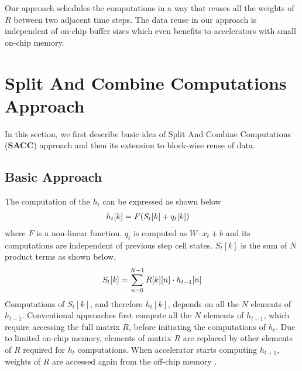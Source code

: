 Our approach schedules the computations in a way that reuses all the weights of $R$ between two adjacent time steps. The data reuse in our approach is independent of on-chip buffer sizes which even benefits to accelerators with small on-chip memory. 

\section{Split And Combine Computations Approach}
In this section, we first describe basic idea of Split And Combine Computations (\textbf{SACC}) approach and then its extension to block-wise reuse of data.
\subsection{Basic Approach}\label{sec:elementWiseApproach}
The computation of the $h_t$ can be expressed as shown below
\begin{align}\label{eq:h_{t}}
	h_{t}[k] &= F( S_{t}[k]+q_{t}[k])
\end{align}
where $F$ is a non-linear function. $q_{t}$ is computed as $W{\cdot}x_t{+}b$ and its computations are independent of previous step cell states. $S_{t}[k]$ is the sum of $N$ product terms as shown below,
\begin{align}\label{eq:S_{t}}
	S_{t}[k] = \sum_{n=0}^{N-1}R[k][n]\cdot h_{t-1}[n]
\end{align}
Computations of $S_{t}[k]$, and therefore $h_{t}[k]$, depends on all the $N$ elements of $h_{t-1}$. Conventional approaches first compute all the $N$ elements of $h_{t-1}$, which require accessing the full matrix $R$, before initiating the computations of $h_{t}$. Due to limited on-chip memory, elements of matrix $R$ are replaced by other elements of $R$ required for $h_{t}$ computations. When accelerator starts computing $h_{t+1}$, weights of $R$ are accessed again from the off-chip memory .

